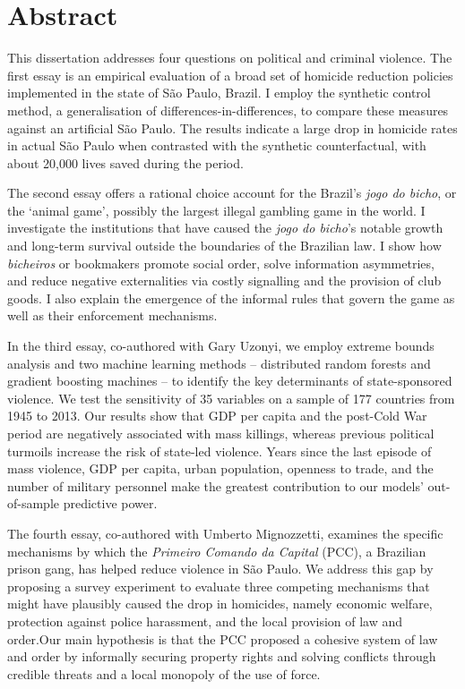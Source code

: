 \documentclass[a4paper,12pt]{report}
\newcommand{\linespacing}{2}
\renewcommand{\baselinestretch}{\linespacing}
\begin{document}
\chapter*{Abstract}
\renewcommand{\baselinestretch}{\linespacing}
\small\normalsize

This dissertation addresses four questions on political and criminal violence. The first essay is an empirical evaluation of a broad set of homicide reduction policies implemented in the state of São Paulo, Brazil. I employ the synthetic control method, a generalisation of differences-in-differences, to compare these measures against an artificial São Paulo. The results indicate a large drop in homicide rates in actual São Paulo when contrasted with the synthetic counterfactual, with about 20,000 lives saved during the period. 

The second essay offers a rational choice account for the Brazil's \textit{jogo do bicho}, or the `animal game', possibly the largest illegal gambling game in the world. I investigate the institutions that have caused the \textit{jogo do bicho}'s notable growth and long-term survival outside the boundaries of the Brazilian law. I show how \textit{bicheiros} or bookmakers promote social order, solve information asymmetries, and reduce negative externalities via costly signalling and the provision of club goods. I also explain the emergence of the informal rules that govern the game as well as their enforcement mechanisms. 

In the third essay, co-authored with Gary Uzonyi, we employ extreme bounds analysis and two machine learning methods -- distributed random forests and gradient boosting machines -- to identify the key determinants of state-sponsored violence. We test the sensitivity of 35 variables on a sample of 177 countries from 1945 to 2013. Our results show that GDP per capita and the post-Cold War period are negatively associated with mass killings, whereas previous political turmoils increase the risk of state-led violence. Years since the last episode of mass violence, GDP per capita, urban population, openness to trade, and the number of military personnel make the greatest contribution to our models' out-of-sample predictive power.

The fourth essay, co-authored with Umberto Mignozzetti, examines the specific mechanisms by which the \textit{Primeiro Comando da Capital} (PCC), a Brazilian prison gang,  has helped reduce violence in São Paulo. We address this gap by proposing a survey experiment to evaluate three competing mechanisms that might have plausibly caused the drop in homicides, namely economic welfare, protection against police harassment, and the local provision of law and order.Our main hypothesis is that the PCC proposed a cohesive system of law and order by informally securing property rights and solving conflicts through credible threats and a local monopoly of the use of force.
\end{document}
